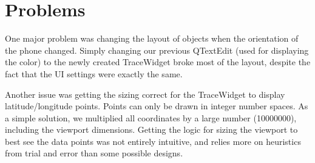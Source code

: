 \documentclass[12pt]{article}
\begin{document}
\section{Problems}
One major problem was changing the layout of objects when the orientation of the
phone changed.  Simply changing our previous QTextEdit (used for displaying the
color) to the newly created TraceWidget broke most of the layout, despite the
fact that the UI settings were exactly the same.

Another issue was getting the sizing correct for the TraceWidget to display
latitude/longitude points.  Points can only be drawn in integer number spaces.
As a simple solution, we multiplied all coordinates by a large number (10000000),
including the viewport dimensions.  Getting the logic for sizing the viewport to
best see the data points was not entirely intuitive, and relies more on
heuristics from trial and error than some possible designs.
\end{document}
